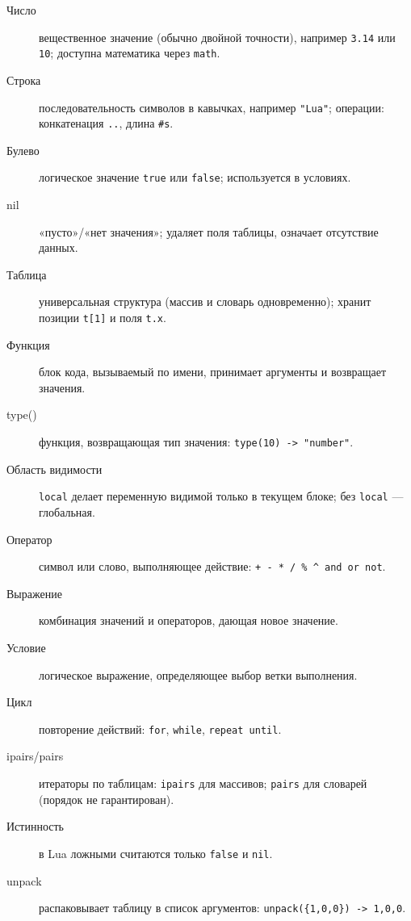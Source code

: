 \begin{description}
  \item[\hypertarget{term:number}{Число}] вещественное значение (обычно двойной точности), например \verb|3.14| или \verb|10|; доступна математика через \verb|math|.
  \item[\hypertarget{term:string}{Строка}] последовательность символов в кавычках, например \verb|"Lua"|; операции: конкатенация \verb|..|, длина \verb|#s|.
  \item[\hypertarget{term:boolean}{Булево}] логическое значение \verb|true| или \verb|false|; используется в условиях.
  \item[\hypertarget{term:nil}{nil}] «пусто»/«нет значения»; удаляет поля таблицы, означает отсутствие данных.
  \item[\hypertarget{term:table}{Таблица}] универсальная структура (массив и словарь одновременно); хранит позиции \verb|t[1]| и поля \verb|t.x|.
  \item[\hypertarget{term:function}{Функция}] блок кода, вызываемый по имени, принимает аргументы и возвращает значения.
  \item[\hypertarget{term:type}{type()}] функция, возвращающая тип значения: \verb|type(10) -> "number"|.
  \item[\hypertarget{term:scope}{Область видимости}] \verb|local| делает переменную видимой только в текущем блоке; без \verb|local| — глобальная.
  \item[\hypertarget{term:operator}{Оператор}] символ или слово, выполняющее действие: \verb|+ - * / % ^ and or not|.
  \item[\hypertarget{term:expression}{Выражение}] комбинация значений и операторов, дающая новое значение.
  \item[\hypertarget{term:condition}{Условие}] логическое выражение, определяющее выбор ветки выполнения.
  \item[\hypertarget{term:loop}{Цикл}] повторение действий: \verb|for|, \verb|while|, \verb|repeat until|.
  \item[\hypertarget{term:ipairs}{ipairs/pairs}] итераторы по таблицам: \verb|ipairs| для массивов; \verb|pairs| для словарей (порядок не гарантирован).
  \item[\hypertarget{term:truthiness}{Истинность}] в Lua ложными считаются только \verb|false| и \verb|nil|.
  \item[\hypertarget{term:unpack}{unpack}] распаковывает таблицу в список аргументов: \verb|unpack({1,0,0}) -> 1,0,0|.
\end{description}

